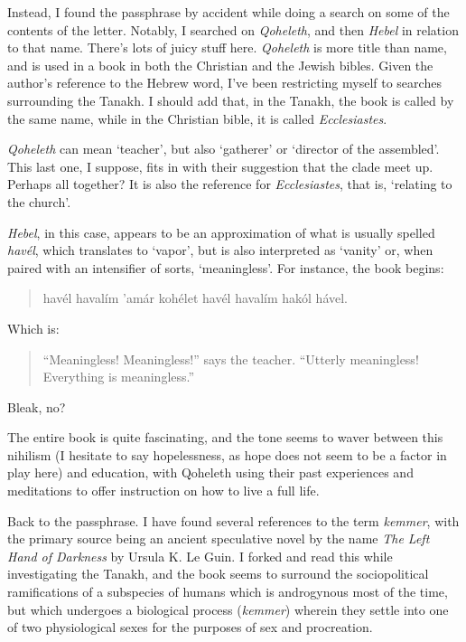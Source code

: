 Instead, I found the passphrase by accident while doing a search on some of the contents of the letter. Notably, I searched on \emph{Qoheleth}, and then \emph{Hebel} in relation to that name. There's lots of juicy stuff here. \emph{Qoheleth} is more title than name, and is used in a book in both the Christian and the Jewish bibles. Given the author's reference to the Hebrew word, I've been restricting myself to searches surrounding the Tanakh. I should add that, in the Tanakh, the book is called by the same name, while in the Christian bible, it is called \emph{Ecclesiastes}.

\emph{Qoheleth} can mean `teacher', but also `gatherer' or `director of the assembled'. This last one, I suppose, fits in with their suggestion that the clade meet up. Perhaps all together? It is also the reference for \emph{Ecclesiastes}, that is, `relating to the church'.

\emph{Hebel}, in this case, appears to be an approximation of what is usually spelled \emph{havél}, which translates to `vapor', but is also interpreted as `vanity' or, when paired with an intensifier of sorts, `meaningless'. For instance, the book begins:

\begin{quote}
havél havalím 'amár kohélet havél havalím hakól hável.
\end{quote}

Which is:

\begin{quote}
``Meaningless! Meaningless!'' says the teacher. ``Utterly meaningless! Everything is meaningless.''
\end{quote}

Bleak, no?

The entire book is quite fascinating, and the tone seems to waver between this nihilism (I hesitate to say hopelessness, as hope does not seem to be a factor in play here) and education, with Qoheleth using their past experiences and meditations to offer instruction on how to live a full life.

Back to the passphrase. I have found several references to the term \emph{kemmer}, with the primary source being an ancient speculative novel by the name \emph{The Left Hand of Darkness} by Ursula K. Le Guin. I forked and read this while investigating the Tanakh, and the book seems to surround the sociopolitical ramifications of a subspecies of humans which is androgynous most of the time, but which undergoes a biological process (\emph{kemmer}) wherein they settle into one of two physiological sexes for the purposes of sex and procreation.

